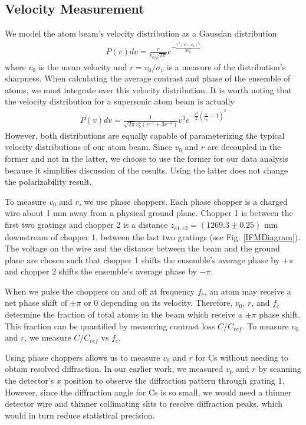 \documentclass[twocolumn,prl,showpacs,superscriptaddress]{revtex4-1}   %
\newcommand{\figref}[1]{Fig. \ref{#1}}
\begin{document}
\subsection{Velocity Measurement}

We model the atom beam's velocity distribution as a Gaussian distribution
\begin{align}
	P(v)dv = \frac{r}{v_0\sqrt{2\pi}}e^{-\frac{r^2(v-v_0)^2}{2v_0^2}}
	\label{PvelGaussian}
\end{align}
where $v_0$ is the mean velocity and $r = v_0/\sigma_v$ is a measure of the distribution's sharpness. When calculating the average contrast and phase of the ensemble of atoms, we must integrate over this velocity distribution. It is worth noting that the velocity distribution for a supersonic atom beam is actually
\begin{align}
	P(v)dv = \frac{1}{\sqrt{2\pi}v_0^4(r^{-1}+3r^{-3})}
	v^3
	e^{-\frac{r^2}{2}\left(\frac{v}{v_0}-1\right)^2}
	\label{PvelCubed}
\end{align}
However, both distributions are equally capable of parameterizing the typical velocity distributions of our atom beam. Since $v_0$ and $r$ are decoupled in the former and not in the latter, we choose to use the former for our data analysis because it simplifies discussion of the results. Using the latter does not change the polarizability result. 

To measure $v_0$ and $r$, we use phase choppers. Each phase chopper is a charged wire about 1 mm away from a physical ground plane. Chopper 1 is between the first two gratings and chopper 2 is a distance $z_{c1,c2} = (1269.3 \pm 0.25)$ mm downstream of chopper 1, between the last two gratings (see \figref{IFMDiagram}). The voltage on the wire and the distance between the beam and the ground plane are chosen such that chopper 1 shifts the ensemble's average phase by $+\pi$ and chopper 2 shifts the ensemble's average phase by $-\pi$. 

When we pulse the choppers on and off at frequency $f_c$, an atom may receive a net phase shift of $\pm\pi$ or $0$ depending on its velocity. Therefore, $v_0$, $r$, and $f_c$ determine the fraction of total atoms in the beam which receive a $\pm\pi$ phase shift. This fraction can be quantified by measuring contrast loss $C/C_{ref}$. To measure $v_0$ and $r$, we measure $C/C_{ref}$ vs $f_c$.

Using phase choppers allows us to measure $v_0$ and $r$ for Cs without needing to obtain resolved diffraction. In our earlier work, we measured $v_0$ and $r$ by scanning the detector's $x$ position to observe the diffraction pattern through grating 1. However, since the diffraction angle for Cs is so small, we would need a thinner detector wire and thinner collimating slits to resolve diffraction peaks, which would in turn reduce statistical precision.
\end{document}
